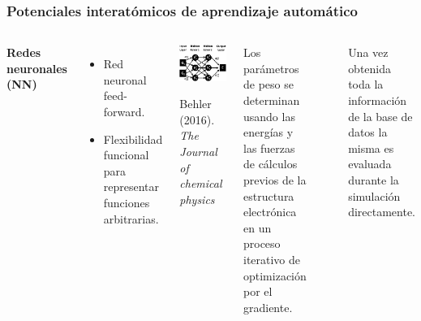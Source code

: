 \documentclass[aspectratio=169]{beamer}
\let\oldtextbf\textbf
\renewcommand{\textbf}[1]{\textcolor{nordblue}{\oldtextbf{#1}}}
\begin{document}
\begin{frame}
\begin{columns}
        \end{columns}

    \end{frame}
    
    \begin{frame}
        \frametitle{Potenciales interatómicos de aprendizaje automático}

        \begin{columns}
            \textbf{Redes neuronales (NN)}
            \begin{itemize}
                \item Red neuronal feed-forward.
                \item Flexibilidad funcional para representar funciones
                    arbitrarias.
            \end{itemize}

            \begin{center}
                \includegraphics[width=\columnwidth]{MLP-NN.png}

                \tiny{Behler (2016). \textit{The Journal of chemical physics}}
            \end{center}
        
            Los parámetros de peso se determinan usando las energías y las fuerzas
            de cálculos previos de la estructura electrónica en un proceso 
            iterativo de optimización por el gradiente.

            \

            Una vez obtenida toda la información de la base de datos la misma es
            evaluada durante la simulación directamente.

        \end{columns}

    \end{frame}
    
\end{document}
